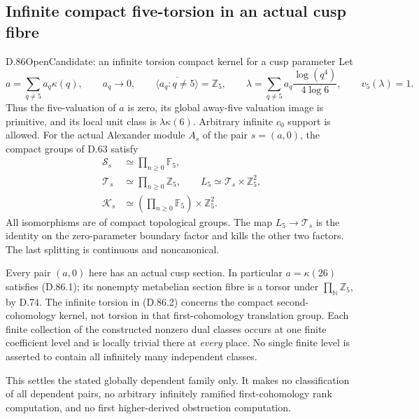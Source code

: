 \subsection{Infinite compact five-torsion in an actual cusp fibre}

\begin{statement}{D.86}{Open}{Candidate: an infinite torsion compact kernel for a cusp parameter}
Let
\[
 a=\sum_{q\ne5}a_q\kappa(q),\qquad a_q\longrightarrow0,
 \qquad \overline{\langle a_q:q\ne5\rangle}=\mathbb Z_5,
 \qquad
 \lambda=\sum_{q\ne5}a_q\frac{\log(q^4)}{4\log6},
 \qquad v_5(\lambda)=1.                                  \tag{D.86.1}
\]
Thus the five-valuation of \(a\) is zero, its global away-five
valuation image is primitive, and its local unit class is
\(\lambda\kappa(6)\). Arbitrary infinite \(c_0\) support is allowed.
For the actual Alexander module \(A_s\) of the pair \(s=(a,0)\),
the compact groups of D.63 satisfy
\[
 \begin{split}
 \mathcal S_s&\simeq\prod_{n\ge0}\mathbb F_5,\\
 \mathcal T_s&\simeq\prod_{n\ge0}\mathbb Z_5,\qquad
 L_5\simeq\mathcal T_s\times\mathbb Z_5^2,\\
 \mathcal K_s&\simeq
       \left(\prod_{n\ge0}\mathbb F_5\right)\times\mathbb Z_5^2.
 \end{split}                                             \tag{D.86.2}
\]
All isomorphisms are of compact topological groups. The map
\(L_5\to\mathcal T_s\) is the identity on the zero-parameter
boundary factor and kills the other two factors. The last
splitting is continuous and noncanonical.

Every pair \((a,0)\) here has an actual cusp section. In particular
\(a=\kappa(26)\) satisfies (D.86.1); its nonempty metabelian
section fibre is a torsor under
\(\prod_{\mathbb N}\mathbb Z_5\), by D.74. The infinite torsion
in (D.86.2) concerns the compact second-cohomology kernel, not
torsion in that first-cohomology translation group. Each finite
collection of the constructed nonzero dual classes occurs at
one finite coefficient level and is locally trivial there at
\emph{every} place. No single finite level is asserted to contain
all infinitely many independent classes.

This settles the stated globally dependent family only. It
makes no classification of all dependent pairs, no arbitrary
infinitely ramified first-cohomology rank computation, and no
first higher-derived obstruction computation.
\end{statement}

